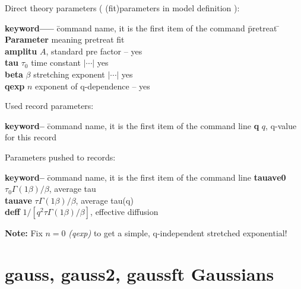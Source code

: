 \documentclass[11pt,fleqn]{book} %
\newcommand{\linespace}{\vspace{4ex}}
\newcommand{\desc}[1]{\hskip 0.5cm {\color{descgray} #1}}
\begin{document}
\linespace

Direct theory parameters ( (fit)parameters in model definition ):
\begin{tabbing}
\textbf{keyword-----}  \= command name, it is the first item of the command \= pretreat   \=   \kill
\textbf{Parameter}  \> meaning                                           \> pretreat   \> fit      \\
\textbf{amplitu  } \>  $A$, standard pre factor                           \>  --        \> yes      \\         
\textbf{tau      } \>  $\tau_0$ time constant                            \> $|\cdots|$ \> yes      \\
\textbf{beta     } \>  $\beta$  stretching exponent                       \> $|\cdots|$ \> yes       \\
\textbf{qexp     } \>  $n$ exponent of q-dependence                      \>  --        \> yes      \\   
\end{tabbing}

\linespace
Used record parameters: 
\begin{tabbing}
\textbf{keyword--}  \= command name, it is the first item of the command line                    \kill
\textbf{q        } \>  $q$, q-value for this record          \\         
\end{tabbing}

\linespace
Parameters pushed to records:
\begin{tabbing}
\textbf{keyword--}  \= command name, it is the first item of the command line                    \kill
\textbf{tauave0  } \>  $\tau_0  \Gamma(1\beta) /\beta$, average tau           \\         
\textbf{tauave  }  \>  $\tau    \Gamma(1\beta) /\beta$, average tau(q)       \\         
\textbf{deff    }  \>  $1 /[q^2 \tau    \Gamma(1\beta) /\beta]$, effective diffusion      \\         
\end{tabbing}

\linespace
{\bf Note:} Fix $n=0$ \emph{(qexp)} to get a simple, q-independent stretched exponential!

\chapter{gauss, gauss2, gaussft \desc{Gaussians}}
\end{document}
